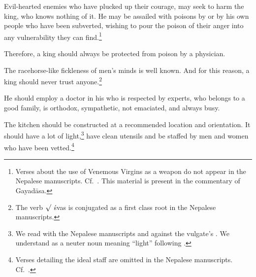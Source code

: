 \begin{translation}
\item[4--5]  

Evil-hearted enemies who have plucked up their courage, may seek to harm the king,
who knows nothing of it.  He may be assailed with poisons by or by his own people
who have been subverted, wishing to pour the poison of their anger into any
vulnerability they can find.\footnote{Verses about the use of Venemous Virgins as a weapon
do not appear in the Nepalese manuscripts. Cf.\ \cite[81\,f., 132]{wuja-2003}.  This material 
is present in the commentary of Gayadāsa.} 

\item[6] Therefore, a king should always be protected from poison by a physician.


\item [7] 

The racehorse-like fickleness of men's minds is well known. And for this reason, a
king should never trust anyone.\footnote{The verb $\surd$ śvas is conjugated as a
first class root in the Nepalese manuscripts.}

\item [8--11]

He should employ a doctor in his  who is respected by experts, who 
belongs to a good family, is orthodox, sympathetic, not emaciated, and always busy.

\item [12--13]

The kitchen should be constructed at a recommended location and orientation.  It should
have a lot of light,\footnote{We read  with the Nepalese manuscripts and 
against the vulgate's .  We understand  as a neuter noun 
meaning “light” following \citet[1050a]{apte-prac}.} have clean utensils and be staffed by 
men 
and
women who have been vetted.\footnote{Verses detailing the ideal staff are omitted in the 
Nepalese manuscripts. 
Cf.\ \cites[560]{vulgate}[132]{wuja-2003}.}



\end{translation}
